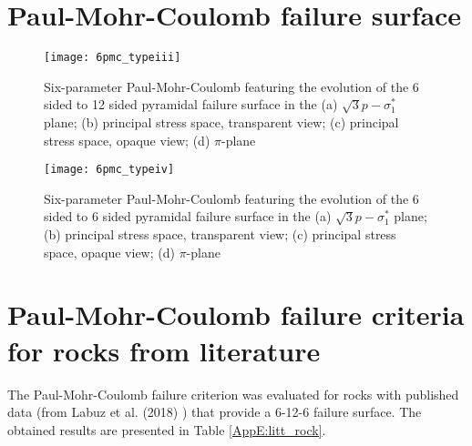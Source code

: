 \chapter{Paul-Mohr-Coulomb failure surface}\label{App:D}

\begin{figure}[!ht]
    \centering
    \texttt{[image: 6pmc\_typeiii]}
    \captionsetup{justification=centering}
    \caption{Six-parameter Paul-Mohr-Coulomb featuring the evolution of the 6 sided to 12 sided pyramidal failure surface in the (a) $\sqrt{3}p - \sigma_1^*$ plane; (b) principal stress space, transparent view; (c) principal stress space, opaque view; (d) $\pi$-plane \cite{Labuz2018}}
    \label{fig5:6pmc_typeiii}
\end{figure}

\begin{figure}[!ht]
    \centering
    \texttt{[image: 6pmc\_typeiv]}
    \captionsetup{justification=centering}
    \caption{Six-parameter Paul-Mohr-Coulomb featuring the evolution of the 6 sided to 6 sided pyramidal failure surface in the (a) $\sqrt{3}p - \sigma_1^*$ plane; (b) principal stress space, transparent view; (c) principal stress space, opaque view; (d) $\pi$-plane \cite{Labuz2018}}
    \label{fig5:6pmc_typeiv}
\end{figure}

\chapter{Paul-Mohr-Coulomb failure criteria for rocks from literature}\label{App:E}

The Paul-Mohr-Coulomb failure criterion was evaluated for rocks with published data (from Labuz et al. (2018) \cite{Labuz2018}) that provide a 6-12-6 failure surface. The obtained results are presented in Table \ref{AppE:litt_rock}.





